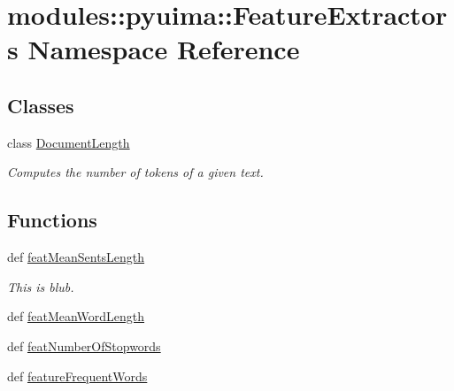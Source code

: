\hypertarget{namespacemodules_1_1pyuima_1_1FeatureExtractors}{\section{modules\-:\-:pyuima\-:\-:\-Feature\-Extractors \-Namespace \-Reference}
\label{namespacemodules_1_1pyuima_1_1FeatureExtractors}
}
\subsection*{\-Classes}
\begin{DoxyCompactItemize}
\item 
class \hyperlink{classmodules_1_1pyuima_1_1FeatureExtractors_1_1DocumentLength}{\-Document\-Length}
\begin{DoxyCompactList}\small\item\em \-Computes the number of tokens of a given text. \end{DoxyCompactList}\end{DoxyCompactItemize}
\subsection*{\-Functions}
\begin{DoxyCompactItemize}
\item 
def \hyperlink{namespacemodules_1_1pyuima_1_1FeatureExtractors_a02ef98c7b5ed9a05d3b4ac8b0b00199b}{feat\-Mean\-Sents\-Length}
\begin{DoxyCompactList}\small\item\em \-This is blub. \end{DoxyCompactList}\item 
def \hyperlink{namespacemodules_1_1pyuima_1_1FeatureExtractors_a2b43ad1a37af5a0557ffba952cc90768}{feat\-Mean\-Word\-Length}
\item 
def \hyperlink{namespacemodules_1_1pyuima_1_1FeatureExtractors_a0160504c336fb5995a5013236f3dd88a}{feat\-Number\-Of\-Stopwords}
\item 
def \hyperlink{namespacemodules_1_1pyuima_1_1FeatureExtractors_aa6b55e6872f06caa8fdd2d99d6e0a1cc}{feature\-Frequent\-Words}
\end{DoxyCompactItemize}


